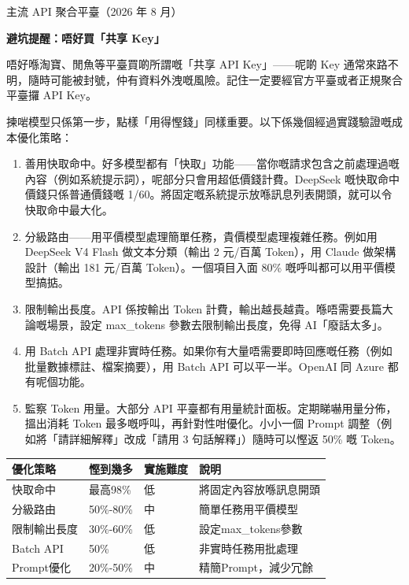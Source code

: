 \begin{center}\small\color{gray}主流 API 聚合平臺（2026 年 8 月）\end{center}

\textbf{避坑提醒：唔好買「共享 Key」}\par

唔好喺淘寶、閒魚等平臺買啲所謂嘅「共享 API Key」——呢啲 Key 通常來路不明，隨時可能被封號，仲有資料外洩嘅風險。記住一定要經官方平臺或者正規聚合平臺攞 API Key。


揀啱模型只係第一步，點樣「用得慳錢」同樣重要。以下係幾個經過實踐驗證嘅成本優化策略：

\begin{enumerate}
  \item 善用快取命中。好多模型都有「快取」功能——當你嘅請求包含之前處理過嘅內容（例如系統提示詞），呢部分只會用超低價錢計費。DeepSeek 嘅快取命中價錢只係普通價錢嘅 1/60。將固定嘅系統提示放喺訊息列表開頭，就可以令快取命中最大化。
  \item 分級路由——用平價模型處理簡單任務，貴價模型處理複雜任務。例如用 DeepSeek V4 Flash 做文本分類（輸出 2 元/百萬 Token），用 Claude 做架構設計（輸出 181 元/百萬 Token）。一個項目入面 80\% 嘅呼叫都可以用平價模型搞掂。
  \item 限制輸出長度。API 係按輸出 Token 計費，輸出越長越貴。喺唔需要長篇大論嘅場景，設定 max\_tokens 參數去限制輸出長度，免得 AI「廢話太多」。
  \item 用 Batch API 處理非實時任務。如果你有大量唔需要即時回應嘅任務（例如批量數據標註、檔案摘要），用 Batch API 可以平一半。OpenAI 同 Azure 都有呢個功能。
  \item 監察 Token 用量。大部分 API 平臺都有用量統計面板。定期睇嚇用量分佈，搵出消耗 Token 最多嘅呼叫，再針對性咁優化。小小一個 Prompt 調整（例如將「請詳細解釋」改成「請用 3 句話解釋」）隨時可以慳返 50\% 嘅 Token。
\end{enumerate}

\begin{center}
\begin{tabularx}{\linewidth}{|X|X|X|X|}
\hline
\textbf{優化策略} & \textbf{慳到幾多} & \textbf{實施難度} & \textbf{說明} \tabularnewline
\hline
快取命中 & 最高98\% & 低 & 將固定內容放喺訊息開頭 \tabularnewline
分級路由 & 50\%-80\% & 中 & 簡單任務用平價模型 \tabularnewline
限制輸出長度 & 30\%-60\% & 低 & 設定max\_tokens參數 \tabularnewline
Batch API & 50\% & 低 & 非實時任務用批處理 \tabularnewline
Prompt優化 & 20\%-50\% & 中 & 精簡Prompt，減少冗餘 \tabularnewline
\hline
\end{tabularx}
\end{center}

